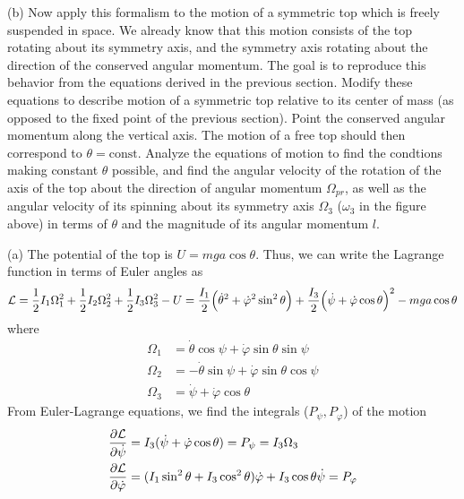 \documentclass[12pt]{article}
\begin{document}
\begin{problem}{2}
(b) Now apply this formalism to the motion of a symmetric top which is freely
suspended in space. We already know that this motion consists of the top
rotating about its symmetry axis, and the symmetry axis rotating about the
direction of the conserved angular momentum. The goal is to reproduce this
behavior from the equations derived in the previous section. Modify these
equations to describe motion of a symmetric top relative to its center of mass
(as opposed to the fixed point of the previous section). Point the conserved
angular momentum along the vertical axis. The motion of a free top should then
correspond to $\theta=\text{const}$. Analyze the equations of motion to find the
condtions making constant $\theta$ possible, and find the angular velocity of
the rotation of the axis of the top about the direction of angular momentum
$\Omega_{pr}$, as well as the angular velocity of its spinning about its
symmetry axis $\Omega_3$ ($\omega_3$ in the figure above) in terms of $\theta$
and the magnitude of its angular momentum $l$.
\begin{solution}
(a) The potential of the top is $U=mga\cos\theta$. Thus, we can write the
Lagrange function in terms of Euler angles as
\begin{equation}
    \mathcal{L}
    =\frac12I_1\Omega_1^2+\frac12I_2\Omega_2^2+\frac12I_3\Omega_3^2-U
    =\frac{I_1}{2}\qty(\dot\theta^2+\dot\varphi^2\sin^2\theta) 
    +\frac{I_3}{2}\qty(\dot\psi+\dot\varphi\cos\theta)^2-mga\cos\theta
\end{equation}
where
\begin{subequations}\label{p2a:euler_angles}
    \begin{align}
        \Omega_1&=\dot\theta\cos\psi+\dot\varphi\sin\theta\sin\psi\\
        \Omega_2&=-\dot\theta\sin\psi+\dot\varphi\sin\theta\cos\psi\\
        \Omega_3&=\dot\psi+\dot\varphi\cos\theta
    \end{align}
\end{subequations}
From Euler-Lagrange equations, we find the integrals ($P_\psi,P_\varphi$) of the
motion
\begin{subequations}\label{p2a:P}
    \begin{align}
        \frac{\partial\mathcal{L}}{\partial\dot\psi}
        &=I_3(\dot\psi+\dot\varphi\cos\theta)=P_\psi=I_3\Omega_3\\
    \frac{\partial\mathcal{L}}{\partial\dot\varphi}
        &=(I_1\sin^2\theta+I_3\cos^2\theta)\dot\varphi+I_3\cos\theta\dot\psi
        =P_\varphi
    \end{align}

\end{subequations}
\end{solution}
\end{problem}
\end{document}
